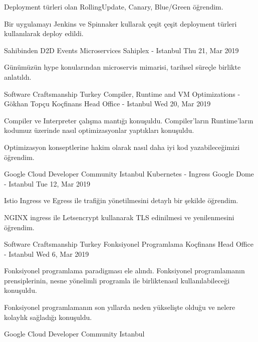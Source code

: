 \begin{cventries}
{\begin{cvitems}
        \item{Deployment türleri olan RollingUpdate, Canary, Blue/Green öğrendim.}
        \item{Bir uygulamayı Jenkins ve Spinnaker kullarak çeşit çeşit deployment türleri kullanılarak deploy edildi.}
      \end{cvitems}
    }
    \cventry
    {Sahibinden D2D Events}
    {Microservices}
    {Sahiplex - Istanbul}
    {Thu 21, Mar 2019}
    {
      \begin{cvitems}
        \item{Günümüzün hype konularından microservis mimarisi, tarihsel süreçle birlikte anlatıldı.}
      \end{cvitems}
    }
    \cventry
    {Software Craftsmanship Turkey}
    {Compiler, Runtime and VM Optimizations - Gökhan Topçu}
    {Koçfinans Head Office - Istanbul}
    {Wed 20, Mar 2019}
    {
      \begin{cvitems}
        \item{Compiler ve Interpreter çalışma mantığı konuşuldu. Compiler'ların Runtime'ların kodumuz üzerinde nasıl optimizasyonlar yaptıkları konuşuldu.}
        \item{Optimizasyon konseptlerine hakim olarak nasıl daha iyi kod yazabileceğimizi öğrendim.}
      \end{cvitems}
    }
    \cventry
    {Google Cloud Developer Community Istanbul}
    {Kubernetes - Ingress}
    {Google Dome - Istanbul}
    {Tue 12, Mar 2019}
    {
      \begin{cvitems}
        \item{Istio Ingress ve Egress ile trafiğin yönetilmesini detaylı bir şekilde öğrendim.}
        \item{NGINX ingress ile Letsencrypt kullanarak TLS edinilmesi ve yenilenmesini öğrendim.}
      \end{cvitems}
    }
    \cventry
    {Software Craftsmanship Turkey}
    {Fonksiyonel Programlama}
    {Koçfinans Head Office - Istanbul}
    {Wed 6, Mar 2019}
    {
      \begin{cvitems}
        \item{Fonksiyonel programlama paradigması ele alındı. Fonksiyonel programlamanın prensiplerinin, nesne yönelimli programla ile birliktenasıl kullanılabileceği konuşuldu.}
        \item{Fonksiyonel programlamanın son yıllarda neden yükselişte olduğu ve nelere kolaylık sağladığı konuşuldu.}
      \end{cvitems}
    }
    \cventry
    {Google Cloud Developer Community Istanbul}

\end{cventries}

